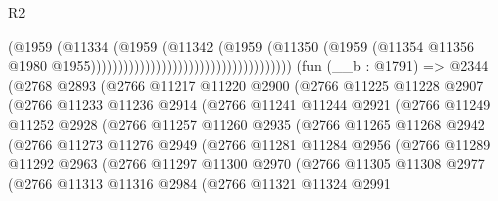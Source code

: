 \begin{lexlean}{R2}
\begin{coremodule}
                                                              (@1959
                                                                (@11334
                                                                  (@1959
                                                                    (@11342
                                                                      (@1959
                                                                        (@11350
                                                                          (@1959
                                                                            (@11354
                                                                              @11356
                                                                              @1980
                                                                              @1955)))))))))))))))))))))))))))))))))))))
    (fun (__b : @1791) =>
    @2344
      (@2768
        @2893
        (@2766
          @11217
          @11220
          @2900
          (@2766
            @11225
            @11228
            @2907
            (@2766
              @11233
              @11236
              @2914
              (@2766
                @11241
                @11244
                @2921
                (@2766
                  @11249
                  @11252
                  @2928
                  (@2766
                    @11257
                    @11260
                    @2935
                    (@2766
                      @11265
                      @11268
                      @2942
                      (@2766
                        @11273
                        @11276
                        @2949
                        (@2766
                          @11281
                          @11284
                          @2956
                          (@2766
                            @11289
                            @11292
                            @2963
                            (@2766
                              @11297
                              @11300
                              @2970
                              (@2766
                                @11305
                                @11308
                                @2977
                                (@2766
                                  @11313
                                  @11316
                                  @2984
                                  (@2766
                                    @11321
                                    @11324
                                    @2991

\end{coremodule}
\end{lexlean}
